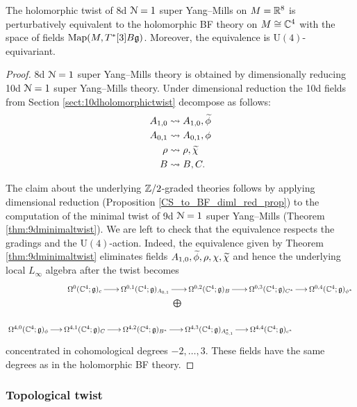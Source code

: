 \documentclass[10pt, oneside]{article}
\renewcommand{\U}{\mathrm{U}}
\begin{document}
\begin{theorem}
The holomorphic twist of 8d $\mathcal N=1$ super Yang--Mills on $M=\mathbb R^8$ is perturbatively equivalent to the holomorphic BF theory on $M\cong\mathbb C^4$ with the space of fields $\operatorname{Map}(M, T^*[3] B\mathfrak g)$. Moreover, the equivalence is $\U(4)$-equivariant.
\label{thm:8dholomorphictwist}
\end{theorem}
\begin{proof}
8d $\mathcal N=1$ super Yang--Mills theory is obtained by dimensionally reducing 10d $\mathcal N=1$ super Yang--Mills theory. Under dimensional reduction the 10d fields from Section \ref{sect:10dholomorphictwist} decompose as follows:
\begin{align*}
A_{1, 0}&\rightsquigarrow A_{1, 0}, \widetilde{\phi} \\
A_{0, 1}&\rightsquigarrow A_{0, 1}, \phi \\
\rho&\rightsquigarrow \rho, \widetilde{\chi} \\
B&\rightsquigarrow B, C.
\end{align*}

The claim about the underlying $\mathbb Z/2$-graded theories follows by applying dimensional reduction (Proposition \ref{CS_to_BF_diml_red_prop}) to the computation of the minimal twist of 9d $\mathcal N=1$ super Yang--Mills (Theorem \ref{thm:9dminimaltwist}). We are left to check that the equivalence respects  the gradings and the $\U(4)$-action. Indeed, the equivalence given by Theorem \ref{thm:9dminimaltwist} eliminates fields $A_{1, 0}, \widetilde{\phi}, \rho, \chi, \widetilde{\chi}$ and hence the underlying local $L_\infty$ algebra after the twist becomes
\[
\xymatrix@R=0.5cm@C=0.5cm{
&\Omega^0(\CC^4; \gg)_c \ar[r] &\Omega^{0,1}(\CC^4; \gg)_{A_{0,1}} \ar[r] &\Omega^{0,2}(\CC^4; \gg)_{B} \ar[r] &\Omega^{0,3}(\CC^4; \gg)_{C^*} \ar[r] &\Omega^{0,4}(\CC^4; \gg)_{\phi^*} \\
&&\ar@{}^{\bigoplus}[r] &&& \\
\Omega^{4,0}(\CC^4; \gg)_{\phi} \ar[r] &\Omega^{4,1}(\CC^4; \gg)_C \ar[r] &\Omega^{4,2}(\CC^4; \gg)_{B^*} \ar[r] &\Omega^{4,3}(\CC^4; \gg)_{A_{0,1}^*} \ar[r] &\Omega^{4,4}(\CC^4; \gg)_{c^*}&
}
\]
concentrated in cohomological degrees $-2, \dots, 3$. These fields have the same degrees as in the holomorphic BF theory.
\end{proof}

\subsubsection{Topological twist}
\label{sect:8dtopologicaltwist}
\end{document}
